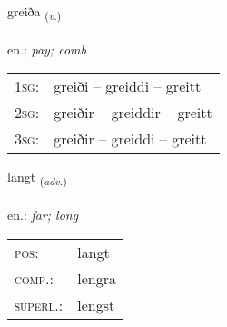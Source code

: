 \documentclass[frontgrid, backgrid]{flacards}\usepackage[]{graphicx}\usepackage[]{xcolor}
\begin{document}
\renewcommand{\blhead}{\vskip5pt {\small\bfseries\footnotesize Sagnorð | Verb }}
\renewcommand{\bcfoot}{\vskip5pt \hspace{2pt}{\small\bfseries\footnotesize 1K}}


{greiða \small{\textsubscript{(\textit{v.})}} \\[1ex] %
\textphonetic{[kreiːða]} \\
en.: \emph{pay; comb} \\  [2ex]
\renewcommand*{\arraystretch}{0.8}
\begin{tabular}{p{1cm}l}
\textsc{1sg}: & greiði -- greiddi -- greitt \\ 
\textsc{2sg}: & greiðir -- greiddir -- greitt \\ 
\textsc{3sg}: & greiðir -- greiddi -- greitt \\ 
\end{tabular}
}

\renewcommand{\flhead}{\vskip5pt \fboxsep=0pt {\small\bfseries\footnotesize Atviksorð | Adverb}}
\renewcommand{\fcfoot}{\vskip5pt \fboxsep=0pt \hspace{2pt}{\small\bfseries\footnotesize 1K}}

\renewcommand{\blhead}{\vskip5pt {\small\bfseries\footnotesize Atviksorð | Adverb }}
\renewcommand{\bcfoot}{\vskip5pt \hspace{2pt}{\small\bfseries\footnotesize 1K}}


{langt \small{\textsubscript{(\textit{adv.})}} \\[1ex] %
\textphonetic{[lauŋ̊t]} \\
en.: \emph{far; long} \\  [2ex]
\renewcommand*{\arraystretch}{0.8}
\begin{tabular}{ll}
\textsc{pos}: & langt \\ 
\textsc{comp.}: & lengra \\ 
\textsc{superl.}: & lengst \\
\end{tabular}
}

\renewcommand{\flhead}{\vskip5pt \fboxsep=0pt {\small\bfseries\footnotesize Nafnorð | Noun}}
\renewcommand{\fcfoot}{\vskip5pt \fboxsep=0pt \hspace{2pt}{\small\bfseries\footnotesize 1K}}
\end{document}
